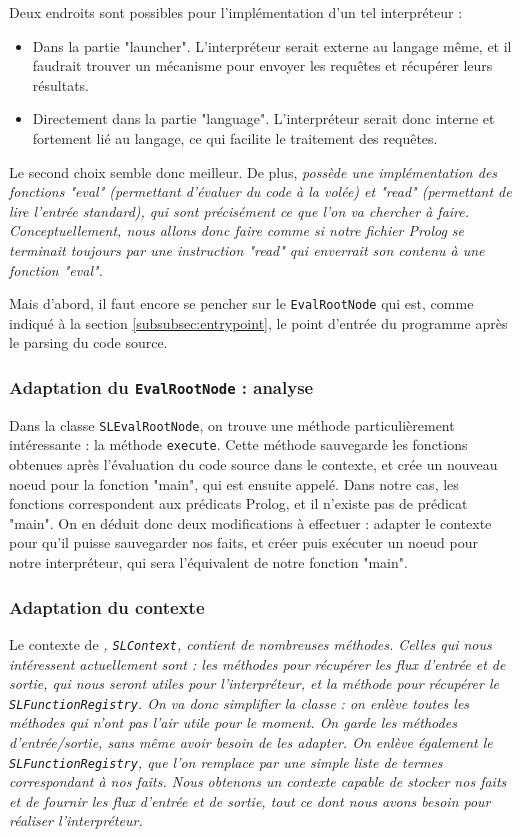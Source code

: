 \documentclass[../report.tex]{subfiles}
\begin{document}
Deux endroits sont possibles pour l'implémentation d'un tel interpréteur :
\begin{itemize}
    \item Dans la partie "launcher". L'interpréteur serait externe au langage même, et il faudrait trouver un mécanisme pour envoyer les requêtes et récupérer leurs résultats.
    \item Directement dans la partie "language". L'interpréteur serait donc interne et fortement lié au langage, ce qui facilite le traitement des requêtes.
\end{itemize}
Le second choix semble donc meilleur. De plus, \sl{} possède une implémentation des fonctions "eval" (permettant d'évaluer du code à la volée) et "read" (permettant de lire l'entrée standard), qui sont précisément ce que l'on va chercher à faire. Conceptuellement, nous allons donc faire comme si notre fichier Prolog se terminait toujours par une instruction "read" qui enverrait son contenu à une fonction "eval".

Mais d'abord, il faut encore se pencher sur le \texttt{EvalRootNode} qui est, comme indiqué à la section \ref{subsubsec:entrypoint}, le point d'entrée du programme après le parsing du code source.
\subsubsection{Adaptation du \texttt{EvalRootNode} : analyse}
Dans la classe \texttt{SLEvalRootNode}, on trouve une méthode particulièrement intéressante : la méthode \texttt{execute}. Cette méthode sauvegarde les fonctions obtenues après l'évaluation du code source dans le contexte, et crée un nouveau noeud pour la fonction "main", qui est ensuite appelé. Dans notre cas, les fonctions correspondent aux prédicats Prolog, et il n'existe pas de prédicat "main". On en déduit donc deux modifications à effectuer : adapter le contexte pour qu'il puisse sauvegarder nos faits, et créer puis exécuter un noeud pour notre interpréteur, qui sera l'équivalent de notre fonction "main".
\subsubsection{Adaptation du contexte}
Le contexte de \sl{}, \texttt{SLContext}, contient de nombreuses méthodes. Celles qui nous intéressent actuellement sont : les méthodes pour récupérer les flux d'entrée et de sortie, qui nous seront utiles pour l'interpréteur, et la méthode pour récupérer le \texttt{SLFunctionRegistry}. On va donc simplifier la classe : on enlève toutes les méthodes qui n'ont pas l'air utile pour le moment. On garde les méthodes d'entrée/sortie, sans même avoir besoin de les adapter. On enlève également le \texttt{SLFunctionRegistry}, que l'on remplace par une simple liste de termes correspondant à nos faits. Nous obtenons un contexte capable de stocker nos faits et de fournir les flux d'entrée et de sortie, tout ce dont nous avons besoin pour réaliser l'interpréteur.
\end{document}
